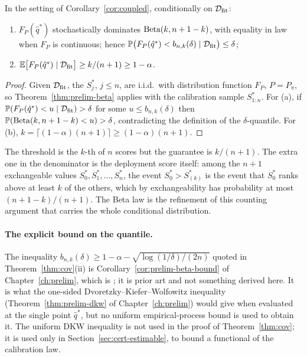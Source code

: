 \documentclass[../../../main.tex]{subfiles}
\begin{document}
\begin{corollary}\label{cor:exact}
In the setting of Corollary~\ref{cor:coupled}, conditionally on $\mathcal D_{\mathrm{fit}}$:
\begin{enumerate}[nosep,label=(\alph*)]
\item $F_{P}(\hat q^*)$ stochastically dominates $\operatorname{Beta}(k,n+1-k)$, with equality in law when $F_P$ is continuous; hence $\mathbb{P}\big(F_P(\hat q^*)<b_{n,k}(\delta)\mid\mathcal D_{\mathrm{fit}}\big)\le\delta$;
\item $\mathbb{E}\big[F_{P}(\hat q^*)\mid\mathcal D_{\mathrm{fit}}\big]\ge k/(n+1)\ge1-\alpha$.
\end{enumerate}
\end{corollary}

\begin{proof}
Given $\mathcal D_{\mathrm{fit}}$, the $S^*_j$, $j\le n$, are i.i.d.\ with distribution function $F_P$, $P=P_\pi$, so Theorem~\ref{thm:prelim-beta} applies with the calibration sample $S^*_{1:n}$. For (a), if $\mathbb{P}(F_P(\hat q^*)<u\mid\mathcal D_{\mathrm{fit}})>\delta$ for some $u\le b_{n,k}(\delta)$ then $\mathbb{P}(\operatorname{Beta}(k,n+1-k)<u)>\delta$, contradicting the definition of the $\delta$-quantile. For (b), $k=\lceil(1-\alpha)(n+1)\rceil\ge(1-\alpha)(n+1)$.
\end{proof}

\begin{remark}
The threshold is the $k$-th of $n$ scores but the guarantee is $k/(n+1)$. The extra one in the denominator is the deployment score itself: among the $n+1$ exchangeable values $S^*_0,S^*_1,\dots,S^*_n$, the event $S^*_0>S^*_{(k)}$ is the event that $S^*_0$ ranks above at least $k$ of the others, which by exchangeability has probability at most $(n+1-k)/(n+1)$. The Beta law is the refinement of this counting argument that carries the whole conditional distribution.
\end{remark}

\paragraph{The explicit bound on the quantile.} The inequality $b_{n,k}(\delta)\ge1-\alpha-\sqrt{\log(1/\delta)/(2n)}$ quoted in Theorem~\ref{thm:cov}(ii) is Corollary~\ref{cor:prelim-beta-bound} of Chapter~\ref{ch:prelim}, which is \citep[Prop.~2a, p.~478]{vovk2012}; it is prior art and not something derived here. It is what the one-sided Dvoretzky--Kiefer--Wolfowitz inequality (Theorem~\ref{thm:prelim-dkw} of Chapter~\ref{ch:prelim}) would give when evaluated at the single point $\hat q^*$, but no uniform empirical-process bound is used to obtain it. The uniform DKW inequality is not used in the proof of Theorem~\ref{thm:cov}; it is used only in Section~\ref{sec:cert-estimable}, to bound a functional of the calibration law.
\end{document}
